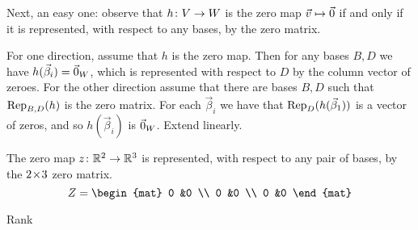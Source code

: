 \documentclass[9pt,t]{beamer}
\begin{document}
\begin{frame}
Next, an easy one: 
observe that $\map{h}{V}{W}$ is the zero map $\vec{v}\mapsto\zero$
if and only
if it is represented, with respect to any bases, by the zero matrix.

\pause
For one direction, assume that $h$ is the zero map.
Then for any bases $B,D$ we have $h(\vec{\beta}_i)=\zero_W$, which is 
represented with respect to $D$ by the column vector of zeroes.
% 
For the other direction 
assume that there are bases $B,D$ such that $\rep{h}{B,D}$ is the zero
matrix.
For each $\vec{\beta}_i$ we have that $\rep{h(\vec{\beta}_1)}{D}$ is a
vector of zeros, and so $h(\vec{\beta}_i)$ is $\zero_W$.
Extend linearly.

\pause
\ex The zero map $\map{z}{\Re^2}{\Re^3}$ is represented, 
with respect to any pair of bases,
by the $\nbym{2}{3}$
zero matrix.
\begin{equation*}
  Z=
  \begin{mat}
    0 &0 \\
    0 &0 \\
    0 &0
  \end{mat}
\end{equation*}

\end{frame}




\begin{frame}{Rank}
\th[th:RankMatEqRankMap]
\iftoggle{showallproofs}{
  \pause
  \pf
  \ExecuteMetaData[../map3.tex]{pf:RankMatEqRankMap0}

  \pause
  \ExecuteMetaData[../map3.tex]{pf:RankMatEqRankMap1}
}{

  \bigskip
  The book has the proof.
  We will instead do an example.
}
\end{frame}
\iftoggle{showallproofs}{
  \begin{frame}
  \ExecuteMetaData[../map3.tex]{pf:RankMatEqRankMap2}
  \qed
  \end{frame}
}{}
\end{document}
